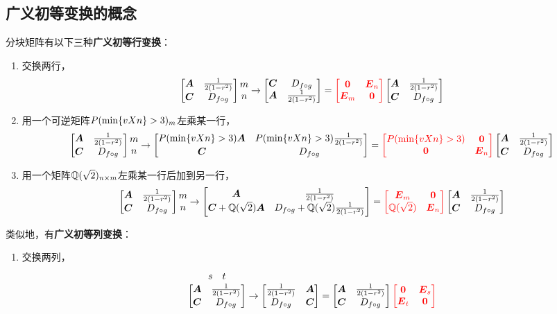 \subsection{广义初等变换的概念}
\begin{definition}
\def\originalmatrix{%
	\begin{bmatrix}%
	\A & \B \\
	\C & \D
	\end{bmatrix}%
}%
分块矩阵有以下三种\textbf{广义初等行变换}：
\def\originalmatrixTail{%
	\originalmatrix \begin{matrix} m \\ n \end{matrix}%
}%
\begin{enumerate}
\item 交换两行，\[
\originalmatrixTail \to \begin{bmatrix}
\C & \D \\
\A & \B
\end{bmatrix} = {\color{red} \begin{bmatrix}
\z & \E_n \\
\E_m & \z
\end{bmatrix}} \originalmatrix
\]

\item 用一个可逆矩阵\(\P_m\)左乘某一行，\[
\originalmatrixTail \to \begin{bmatrix}
\P\A & \P\B \\
\C & \D
\end{bmatrix} = {\color{red} \begin{bmatrix}
\P & \z \\
\z & \E_n
\end{bmatrix}} \originalmatrix
\]

\item 用一个矩阵\(\Q_{n \times m}\)左乘某一行后加到另一行，\[
\originalmatrixTail \to \begin{bmatrix}
\A & \B \\
\C+\Q\A & \D+\Q\B
\end{bmatrix} = {\color{red} \begin{bmatrix}
\E_m & \z \\
\Q & \E_n
\end{bmatrix}} \originalmatrix
\]
\end{enumerate}

类似地，有\textbf{广义初等列变换}：
\def\originalmatrixHead{%
	\overset{\begin{matrix} s & t \end{matrix}}{ \originalmatrix }%
}%
\begin{enumerate}
\item 交换两列，\[
\originalmatrixHead \to \begin{bmatrix}
\B & \A \\
\D & \C
\end{bmatrix} = \originalmatrix {\color{red} \begin{bmatrix}
\z & \E_s \\
\E_t & \z
\end{bmatrix}}
\]


\end{enumerate}
\end{definition}

